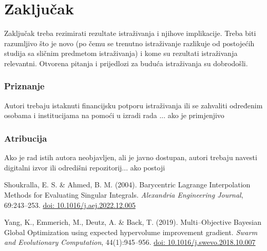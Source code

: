 \documentclass{crebsshr}
\begin{document}
	\section{Zaključak}
	Zaključak treba rezimirati rezultate istraživanja i njihove implikacije. Treba biti razumljivo što je novo (po čemu se trenutno istraživanje razlikuje od postojećih studija sa sličnim predmetom istraživanja) i kome su rezultati istraživanja relevantni. Otvorena pitanja i prijedlozi za buduća istraživanja su dobrodošli.
	\vspace{-0.1cm}
	\subsubsection*{Priznanje} Autori trebaju istaknuti financijsku potporu istraživanja ili se zahvaliti određenim osobama i institucijama na pomoći u izradi rada ...{\color{red} ako je primjenjivo}

	\vspace{-0.1cm}
	\subsubsection*{Atribucija} Ako je rad istih autora neobjavljen, ali je javno dostupan, autori trebaju navesti digitalni izvor ili odredišni repozitorij...{\color{red} ako postoji}
	\medskip

	\newpage


	\begin{thebibliography}{99}

		Shoukralla, E. S. \& Ahmed, B. M. (2004). Barycentric Lagrange Interpolation Methods for Evaluating Singular Integrals. \emph{Alexandria Engineering Journal}, 69:243--253. \href{https://doi.org/10.1016/j.aej.2022.12.005}{doi: 10.1016/j.aej.2022.12.005}

		Yang, K., Emmerich, M., Deutz, A. \& Back, T. (2019). Multi--Objective Bayesian Global Optimization using expected hypervolume improvement gradient. \emph{Swarm and Evolutionary Computation}, 44(1):945--956. \href{https://doi.org/10.1016/j.swevo.2018.10.007}{doi: 10.1016/j.swevo.2018.10.007}


	\end{thebibliography}
\end{document}
